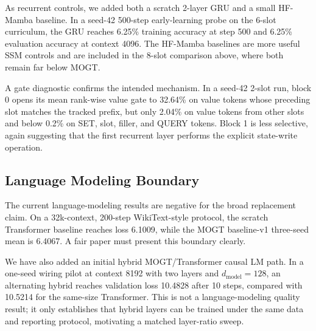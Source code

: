 \documentclass[10pt]{article}
\newcommand{\mogt}{MOGT}
\begin{document}
As recurrent controls, we added both a scratch 2-layer GRU and a small
HF-Mamba baseline. In a seed-42 500-step early-learning probe on the 6-slot
curriculum, the GRU reaches 6.25\% training accuracy at step 500 and 6.25\%
evaluation accuracy at context 4096. The HF-Mamba baselines are more useful SSM
controls and are included in the 8-slot comparison above, where both remain far
below \mogt{}.

A gate diagnostic confirms the intended mechanism. In a seed-42 2-slot run,
block 0 opens its mean rank-wise value gate to 32.64\% on value tokens whose
preceding slot matches the tracked prefix, but only 2.04\% on value tokens from
other slots and below 0.2\% on SET, slot, filler, and QUERY tokens. Block 1 is
less selective, again suggesting that the first recurrent layer performs the
explicit state-write operation.

\subsection{Language Modeling Boundary}

The current language-modeling results are negative for the broad replacement
claim. On a 32k-context, 200-step WikiText-style protocol, the scratch
Transformer baseline reaches loss 6.1009, while the \mogt{} baseline-v1
three-seed mean is 6.4067. A fair paper must present this boundary clearly.

We have also added an initial hybrid MOGT/Transformer causal LM path. In a
one-seed wiring pilot at context 8192 with two layers and
$d_{\mathrm{model}}=128$, an alternating hybrid reaches validation loss 10.4828
after 10 steps, compared with 10.5214 for the same-size Transformer. This is
not a language-modeling quality result; it only establishes that hybrid layers
can be trained under the same data and reporting protocol, motivating a
matched layer-ratio sweep.
\end{document}
